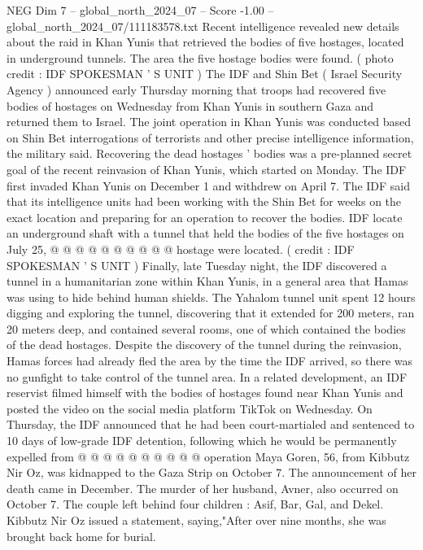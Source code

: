 \begin{textsample}{NEG Dim 7 – global\_north\_2024\_07 – Score -1.00 – global\_north\_2024\_07/111183578.txt}  \label{ex:f7_neg_409}
Recent intelligence revealed new details about the raid in Khan Yunis that retrieved the bodies of five hostages, located in underground tunnels.
The area the five hostage bodies were found. ( photo credit : IDF SPOKESMAN ' S UNIT ) The IDF and Shin Bet ( Israel Security Agency ) announced early Thursday morning that troops had recovered five bodies of hostages on Wednesday from Khan Yunis in southern Gaza and returned them to Israel.
The joint operation in Khan Yunis was conducted based on Shin Bet interrogations of terrorists and other precise intelligence information, the military said.
Recovering the dead hostages ' bodies was a pre-planned secret goal of the recent reinvasion of Khan Yunis, which started on Monday.
The IDF first invaded Khan Yunis on December 1 and withdrew on April 7.
The IDF said that its intelligence units had been working with the Shin Bet for weeks on the exact location and preparing for an operation to recover the bodies.
IDF locate an underground shaft with a tunnel that held the bodies of the five hostages on July 25, @ @ @ @ @ @ @ @ @ @ hostage were located. ( credit : IDF SPOKESMAN ' S UNIT ) Finally, late Tuesday night, the IDF discovered a tunnel in a humanitarian zone within Khan Yunis, in a general area that Hamas was using to hide behind human shields.
The Yahalom tunnel unit spent 12 hours digging and exploring the tunnel, discovering that it extended for 200 meters, ran 20 meters deep, and contained several rooms, one of which contained the bodies of the dead hostages.
Despite the discovery of the tunnel during the reinvasion, Hamas forces had already fled the area by the time the IDF arrived, so there was no gunfight to take control of the tunnel area.
In a related development, an IDF reservist filmed himself with the bodies of hostages found near Khan Yunis and posted the video on the social media platform TikTok on Wednesday.
On Thursday, the IDF announced that he had been court-martialed and sentenced to 10 days of low-grade IDF detention, following which he would be permanently expelled from @ @ @ @ @ @ @ @ @ @ operation Maya Goren, 56, from Kibbutz Nir Oz, was kidnapped to the Gaza Strip on October 7.
The announcement of her death came in December.
The murder of her husband, Avner, also occurred on October 7.
The couple left behind four children : Asif, Bar, Gal, and Dekel.
Kibbutz Nir Oz issued a statement, saying,"After over nine months, she was brought back home for burial.

\end{textsample}
